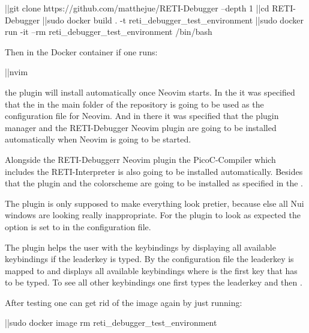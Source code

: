 \documentclass{report}
\begin{document}
\begin{terminal}
	|\prompt|git clone https://github.com/matthejue/RETI-Debugger --depth 1
	|\prompt|cd RETI-Debugger
	|\prompt|sudo docker build . -t reti_debugger_test_environment
	|\prompt|sudo docker run -it --rm reti_debugger_test_environment /bin/bash
\end{terminal}

Then in the Docker container if one runs:

\begin{terminal}
	|\prompt|nvim
\end{terminal}

the plugin will install automatically once Neovim starts. In the  it was specified that the  in the main folder of the repository is going to be used as the configuration file  for Neovim. And in there it was specified that the \alert{plugin manager}  and the RETI-Debugger Neovim plugin are going to be installed automatically when Neovim is going to be started.

Alongside the RETI-Debuggerr Neovim plugin the PicoC-Compiler which includes the \alert{RETI-Interpreter} is also going to be installed automatically. Besides that the  plugin and the colorscheme  are going to be installed as specified in the .

The  plugin is only supposed to make everything look pretier, because else all \alert{Nui} windows are looking really inappropriate. For the  plugin to look as expected the option  is set to  in the configuration file.

The  plugin helps the user with the keybindings by displaying all available keybindings if the \alert{leaderkey} is typed. By the configuration file  the leaderkey is mapped to  and displays all available keybindings where  is the first key that has to be typed. To see all other keybindings one first types the leaderkey  and then \inlinebox{$\leftarrow$}.

After testing one can get rid of the image again by just running:

\begin{terminal}
	|\prompt|sudo docker image rm reti_debugger_test_environment
\end{terminal}
\end{document}
